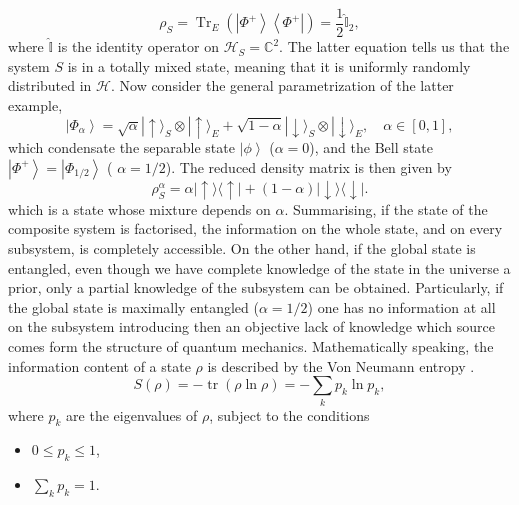 \begin{equation}
\rho_{S}=\operatorname{Tr}_{E}\left(\left|\Phi^{+}\right\rangle\left\langle\Phi^{+}\right|\right)=\frac{1}{2} \hat{\mathbb{I}}_{2},
\label{CH1:Entanglement_example_3}
\end{equation}
where $\hat{\mathbb{I}}$ is the identity operator on $\mathcal{H}_S=\mathbb{C}^2$. The latter equation tells us that the system $S$ is in a totally mixed state, meaning that it is uniformly randomly distributed in $\mathcal{H}$. Now consider the general parametrization of the latter example,
\begin{equation}
\left|\Phi_{\alpha}\right\rangle=\sqrt{\alpha}|\uparrow\rangle_{S} \otimes|\uparrow\rangle_{E}+\sqrt{1-\alpha}|\downarrow\rangle_{S} \otimes|\downarrow\rangle_{E}, \quad \alpha \in[0,1],
\label{CH1:Entanglement_example_4}
\end{equation}
which condensate the separable state $\left|\phi\right\rangle$ ($\alpha=0$), and the Bell state$\left|\Phi^{+}\right\rangle=\left|\Phi_{1 / 2}\right\rangle$ ( $\alpha=1/2$). The reduced density matrix is then given by
\begin{equation}
\rho_{S}^{\alpha}=\alpha|\uparrow\rangle\langle\uparrow|+(1-\alpha)| \downarrow\rangle\langle\downarrow|.
\label{CH1:Entanglement_example_5}
\end{equation}
which is a state whose mixture depends on $\alpha$. Summarising, if the state of the composite system is factorised, the information on the whole state, and on every subsystem, is completely accessible. On the other hand, if the global state is entangled, even though we have complete knowledge of the state in the universe a prior, only a partial knowledge of the subsystem can be obtained. Particularly, if the global state is maximally entangled ($\alpha=1/2$) one has no information at all on the subsystem introducing then an objective lack of knowledge which source comes form the structure of quantum mechanics. Mathematically speaking, the information content of a state $\rho$ is described by the Von Neumann entropy \cite{von_neumann_mathematical_1955}.
\begin{equation}
S(\rho)=-\operatorname{tr}(\rho \ln \rho)=-\sum_{k} p_{k} \ln p_{k},
\label{CH1:von_neumann_entropy}
\end{equation}
where $p_k$ are the eigenvalues of $\rho$, subject to the conditions
\begin{itemize}
\item $0\leq p_k\leq 1$,
\item $\sum_{k} p_k =1$.
\end{itemize}
